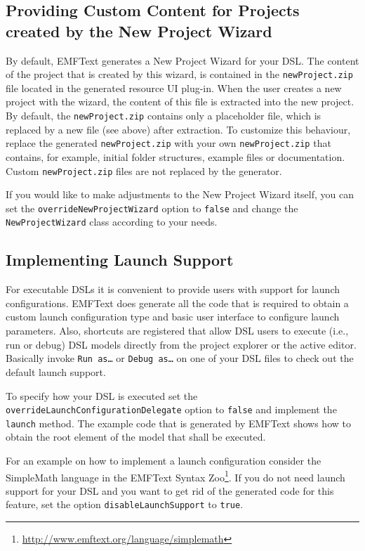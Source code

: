 \subsection{Providing Custom Content for Projects created by the New Project Wizard}

By default, EMFText generates a New Project Wizard for your DSL. The content of the
project that is created by this wizard, is contained in the \texttt{newProject.zip}
file located in the generated resource UI plug-in. When the user creates a new
project with the wizard, the content of this file is extracted into the new project.
By default, the \texttt{newProject.zip} contains only a placeholder file, which
is replaced by a new file (see above) after extraction. To customize this behaviour, 
replace the generated \texttt{newProject.zip} with your own \texttt{newProject.zip} 
that contains, for example, initial folder structures, example files or documentation.
Custom \texttt{newProject.zip} files are not replaced by the generator.

If you would like to make adjustments to the New Project Wizard itself,
you can set the \texttt{overrideNewProjectWizard} option to 
\texttt{false} and change the \texttt{NewProjectWizard} class 
according to your needs.

\subsection{Implementing Launch Support}
\label{sec:launch_support}

For executable DSLs it is convenient to provide users with support for launch
configurations. EMFText does generate all the code that is required to obtain a
custom launch configuration type and basic user interface to configure launch
parameters. Also, shortcuts are registered that allow DSL users to execute
(i.e., run or debug) DSL models directly from the project explorer or the active
editor. Basically invoke \texttt{Run as\ldots} or \texttt{Debug as\ldots} on
one of your DSL files to check out the default launch support.

To specify how your DSL is executed set the
\texttt{overrideLaunchConfigurationDelegate} option to \texttt{false} and
implement the \texttt{launch} method. The example code that is generated by
EMFText shows how to obtain the root element of the model that shall be
executed.

For an example on how to implement a launch configuration consider the
SimpleMath language in the EMFText Syntax
Zoo\footnote{\url{http://www.emftext.org/language/simplemath}}. If you do not
need launch support for your DSL and you want to get rid of the generated code
for this feature, set the option \texttt{disableLaunchSupport} to
\texttt{true}.

